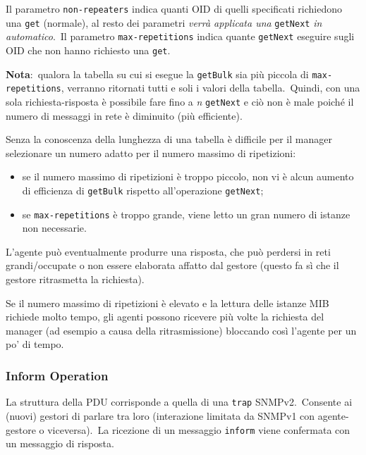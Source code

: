 \noindent Il parametro \texttt{non-repeaters} indica quanti OID di quelli specificati richiedono una \texttt{get} (normale), al resto dei parametri \textit{verrà applicata una} \texttt{getNext} \textit{in automatico}.\
Il parametro \texttt{max-repetitions} indica quante \texttt{getNext} eseguire sugli OID che non hanno richiesto una \texttt{get}.\

\textbf{Nota}:\ qualora la tabella su cui si esegue la \texttt{getBulk} sia più piccola di \texttt{max-repetitions}, verranno ritornati tutti e soli i valori della tabella.\
Quindi, con una sola richiesta-risposta è possibile fare fino a \textit{n} \texttt{getNext} e ciò non è male poiché il numero di messaggi in rete è diminuito (più efficiente).\

Senza la conoscenza della lunghezza di una tabella è difficile per il manager selezionare un numero adatto per il numero massimo di ripetizioni:
\begin{itemize}
    \item se il numero massimo di ripetizioni è troppo piccolo, non vi è alcun aumento di efficienza di \texttt{getBulk} rispetto all'operazione \texttt{getNext};
    \item se \texttt{max-repetitions} è troppo grande, viene letto un gran numero di istanze non necessarie.
\end{itemize}

\noindent L'agente può eventualmente produrre una risposta, che può perdersi in reti grandi/occupate o non essere elaborata affatto dal gestore (questo fa sì che il gestore ritrasmetta la richiesta).\

Se il numero massimo di ripetizioni è elevato e la lettura delle istanze MIB richiede molto tempo, gli agenti possono ricevere più volte la richiesta del manager (ad esempio a causa della ritrasmissione) bloccando così l'agente per un po' di tempo.\

\subsubsection{Inform Operation}

La struttura della PDU corrisponde a quella di una \texttt{trap} SNMPv2.\
Consente ai (nuovi) gestori di parlare tra loro (interazione limitata da SNMPv1 con agente-gestore o viceversa).\
La ricezione di un messaggio \texttt{inform} viene confermata con un messaggio di risposta.\

